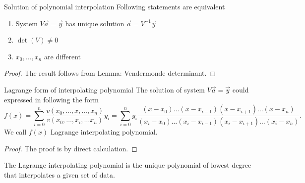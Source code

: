 \begin{theorema}{Solution of polynomial interpolation}{}
    Following statements are equivalent 
    \begin{enumerate}
        \item System $V\vec{a}=\vec{y}$ has unique solution $\vec{a} = V^{-1}\vec{y}$ 
        \item $\det (V)\neq 0$
        \item $x_0, \ldots, x_n$ are different
    \end{enumerate}
\end{theorema}
\begin{proof}
    The result follows from Lemma: Vendermonde determinant.
\end{proof}
\begin{theorema}{Lagrange form of interpolating polynomial}{}
The solution of system $V\vec{a}=\vec{y}$ could expressed in following the form
\[
    f(x) = \sum\limits_{i=0}^{n} \dfrac{v(x_0, \ldots, x, \ldots, x_n)}{v(x_0, \ldots, x_i, \ldots x_n)} y_i = \sum\limits_{i=0}^{n}y_i \dfrac{(x-x_0)\ldots(x-x_{i-1})(x-x_{i+1})\ldots (x-x_n)}{(x_i - x_0)\ldots (x_i - x_{i-1})(x_i - x_{i+1})\ldots (x_i - x_n)}.  
\]
We call $f(x)$ Lagrange interpolating polynomial.
\end{theorema}
\begin{proof}
    The proof is by direct calculation.
\end{proof}
\begin{note}
    The Lagrange interpolating polynomial is the unique polynomial of lowest degree that interpolates a given set of data.
\end{note}

